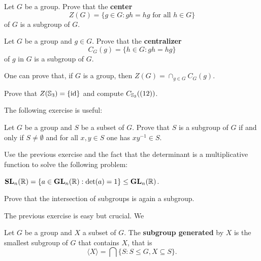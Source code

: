 \begin{exercise}
        Let $G$ be a group. Prove that the \textbf{center} 
        \[
                Z(G)=\{g\in G:gh=hg\text{ for all $h\in G$}\}
        \]
        of $G$ is a subgroup of $G$. 
\end{exercise}

\begin{exercise}
        Let $G$ be a group and $g\in G$. Prove that
        the \textbf{centralizer}
        \[
                C_G(g)=\{h\in G:gh=hg\}
        \]
        of $g$ in $G$ is a subgroup of $G$. 
\end{exercise}

One can prove that, if $G$ is a group, then
$Z(G)=\cap_{g\in G}C_G(g)$. 

\begin{exercise}
Prove that $Z(\mathbb{S}_3)=\{\operatorname{id}\}$ and compute $C_{\mathbb{S}_3}((12))$.
\end{exercise}

The following exercise is useful: 

\begin{exercise}
        Let $G$ be a group and $S$ be a subset of $G$. 
        Prove that $S$ is a subgroup of $G$ if and only if 
        $S\ne\emptyset$ and for all $x,y\in S$ one has
        $xy^{-1}\in S$.
\end{exercise}

Use the previous exercise and
the fact that the determinant is a multiplicative function
to solve the following problem:

\begin{exercise}
\label{xca:SL_subgroup}
$\mathbf{SL}_n(\mathbb{R})=\{a\in\mathbf{GL}_n(\mathbb{R}):\det(a)=1\}\leq\mathbf{GL}_n(\mathbb{R})$. 
\end{exercise}

\begin{exercise}
\label{xca:intersection}
    Prove that the intersection of subgroups is again a subgroup.
\end{exercise}

The previous exercise is easy but crucial. We 

\begin{definition}
        Let $G$ be a group and $X$ a subset of $G$. The \textbf{subgroup
        generated} by $X$ is the smallest subgroup of $G$ that contains
        $X$, that is 
        \[
            \langle X\rangle=\bigcap\{S:S\leq G,X\subseteq S\}.
        \]
\end{definition}

